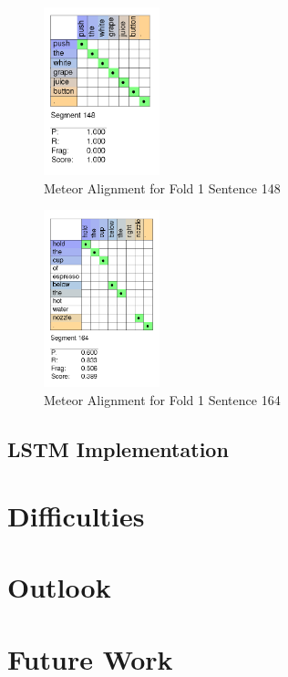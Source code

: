 \documentclass[letterpaper, 12 pt, conference]{ieeeconf}
\begin{document}
\begin{figure}[htb!]
  \centering
  \includegraphics[width=0.3\textwidth]{fold_1_sentence_148}
  \caption{Meteor Alignment for Fold 1 Sentence 148}
  \label{fig:fold_1_sentence_148}
\end{figure}

\begin{figure}[htb!]
  \centering
  \includegraphics[width=0.3\textwidth]{fold_1_sentence_164}
  \caption{Meteor Alignment for Fold 1 Sentence 164}
  \label{fig:fold_1_sentence_164}
\end{figure}

\subsection{LSTM Implementation}

\section{Difficulties}

\section{Outlook}

\section{Future Work}
\end{document}

